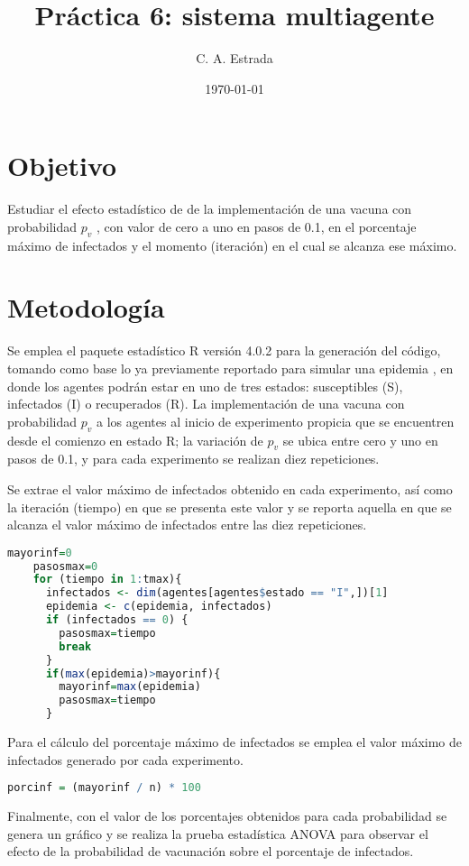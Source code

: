 \documentclass{article}
\title{\bf Práctica 6: sistema multiagente}
\date{\today}
\author{C. A. Estrada}
\begin{document}
\maketitle

\section{Objetivo}
Estudiar el efecto estadístico de de la implementación de una vacuna con probabilidad $p_v$ \cite{dra}, con valor de cero a uno en pasos de 0.1, en el porcentaje máximo de infectados y el momento (iteración) en el cual se alcanza ese máximo. 

\section{Metodología}
Se emplea el paquete estadístico R versión 4.0.2 \cite{R} para la generación del código, tomando como base lo ya previamente reportado para simular una epidemia \cite{dra}, en donde los agentes podrán estar en uno de tres estados: susceptibles (S), infectados (I) o recuperados (R). La implementación de una vacuna con probabilidad $p_v$ a los agentes al inicio de experimento propicia que se encuentren desde el comienzo en estado R; la variación de $p_v$ se ubica entre cero y uno en pasos de 0.1, y para cada experimento se realizan diez repeticiones.

Se extrae el valor máximo de infectados obtenido en cada experimento, así como la iteración (tiempo) en que se presenta este valor y se reporta aquella en que se alcanza el valor máximo de infectados entre las diez repeticiones.
\begin{lstlisting}[language=R]
    mayorinf=0  
    pasosmax=0 
    for (tiempo in 1:tmax){ 
      infectados <- dim(agentes[agentes$estado == "I",])[1]
      epidemia <- c(epidemia, infectados)
      if (infectados == 0) {
        pasosmax=tiempo
        break 
      } 
      if(max(epidemia)>mayorinf){
        mayorinf=max(epidemia)
        pasosmax=tiempo
      }
\end{lstlisting}

Para el cálculo del porcentaje máximo de infectados se emplea el valor máximo de infectados generado por cada experimento.
\begin{lstlisting}[language=R]
porcinf = (mayorinf / n) * 100
\end{lstlisting}

Finalmente, con el valor de los porcentajes obtenidos para cada probabilidad se genera un gráfico y se realiza la prueba estadística ANOVA para observar el efecto de la probabilidad de vacunación sobre el porcentaje de infectados.
\end{document}
